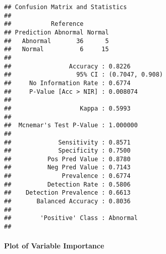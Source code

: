 \documentclass[
]{article}
\newenvironment{Shaded}{\begin{snugshade}}{\end{snugshade}}
\newcommand{\CommentTok}[1]{\textcolor[rgb]{0.56,0.35,0.01}{\textit{#1}}}
\newcommand{\DataTypeTok}[1]{\textcolor[rgb]{0.13,0.29,0.53}{#1}}
\newcommand{\KeywordTok}[1]{\textcolor[rgb]{0.13,0.29,0.53}{\textbf{#1}}}
\newcommand{\NormalTok}[1]{#1}
\newcommand{\OperatorTok}[1]{\textcolor[rgb]{0.81,0.36,0.00}{\textbf{#1}}}
\newcommand{\StringTok}[1]{\textcolor[rgb]{0.31,0.60,0.02}{#1}}
\begin{document}
\begin{Shaded}
\end{Shaded}

\begin{verbatim}
## Confusion Matrix and Statistics
## 
##           Reference
## Prediction Abnormal Normal
##   Abnormal       36      5
##   Normal          6     15
##                                          
##                Accuracy : 0.8226         
##                  95% CI : (0.7047, 0.908)
##     No Information Rate : 0.6774         
##     P-Value [Acc > NIR] : 0.008074       
##                                          
##                   Kappa : 0.5993         
##                                          
##  Mcnemar's Test P-Value : 1.000000       
##                                          
##             Sensitivity : 0.8571         
##             Specificity : 0.7500         
##          Pos Pred Value : 0.8780         
##          Neg Pred Value : 0.7143         
##              Prevalence : 0.6774         
##          Detection Rate : 0.5806         
##    Detection Prevalence : 0.6613         
##       Balanced Accuracy : 0.8036         
##                                          
##        'Positive' Class : Abnormal       
## 
\end{verbatim}

\hypertarget{plot-of-variable-importance-2}{%
\paragraph{Plot of Variable
Importance}\label{plot-of-variable-importance-2}}
\end{document}
